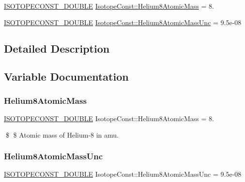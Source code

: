 \begin{DoxyCompactItemize}
\item 
\mbox{\hyperlink{group___isotope_const-_macros_ga8f45a7272ce02c0b4c65c44636ed719a}{I\+S\+O\+T\+O\+P\+E\+C\+O\+N\+S\+T\+\_\+\+D\+O\+U\+B\+LE}} \mbox{\hyperlink{group___isotope_const-_helium-_he8_ga981775d9d7bc0188fc53e87f466b3861}{Isotope\+Const\+::\+Helium8\+Atomic\+Mass}} = 8.
\item 
\mbox{\hyperlink{group___isotope_const-_macros_ga8f45a7272ce02c0b4c65c44636ed719a}{I\+S\+O\+T\+O\+P\+E\+C\+O\+N\+S\+T\+\_\+\+D\+O\+U\+B\+LE}} \mbox{\hyperlink{group___isotope_const-_helium-_he8_gac86e07e06243259ba1728b99fc2216d0}{Isotope\+Const\+::\+Helium8\+Atomic\+Mass\+Unc}} = 9.\+5e-\/08
\end{DoxyCompactItemize}


\subsection{Detailed Description}


\subsection{Variable Documentation}
\mbox{\label{group___isotope_const-_helium-_he8_ga981775d9d7bc0188fc53e87f466b3861}} 
\subsubsection{\texorpdfstring{Helium8\+Atomic\+Mass}{Helium8AtomicMass}}
{\footnotesize\ttfamily \mbox{\hyperlink{group___isotope_const-_macros_ga8f45a7272ce02c0b4c65c44636ed719a}{I\+S\+O\+T\+O\+P\+E\+C\+O\+N\+S\+T\+\_\+\+D\+O\+U\+B\+LE}} Isotope\+Const\+::\+Helium8\+Atomic\+Mass = 8.}

\$ \$ Atomic mass of Helium-\/8 in amu. \mbox{\label{group___isotope_const-_helium-_he8_gac86e07e06243259ba1728b99fc2216d0}} 
\subsubsection{\texorpdfstring{Helium8\+Atomic\+Mass\+Unc}{Helium8AtomicMassUnc}}
{\footnotesize\ttfamily \mbox{\hyperlink{group___isotope_const-_macros_ga8f45a7272ce02c0b4c65c44636ed719a}{I\+S\+O\+T\+O\+P\+E\+C\+O\+N\+S\+T\+\_\+\+D\+O\+U\+B\+LE}} Isotope\+Const\+::\+Helium8\+Atomic\+Mass\+Unc = 9.\+5e-\/08}

